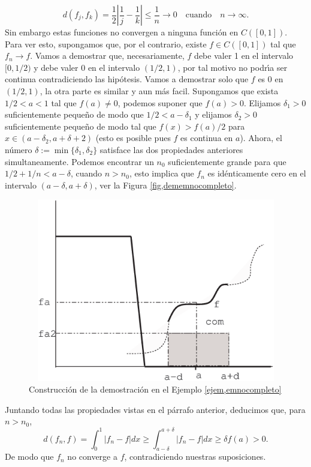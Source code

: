 \begin{ejemplo}
\[
    d(f_j,f_k)=\frac12|\frac1j-\frac1k|\leq \frac1n\rightarrow
    0\quad\text{cuando}\quad n\rightarrow \infty.
\]
Sin embargo estas funciones no convergen a ninguna funci\'on en
$C([0,1])$. Para ver esto, supongamos que, por el contrario,
existe $f\in C([0,1])$ tal que $f_n\rightarrow f$. Vamos a
demostrar que, necesariamente, $f$ debe valer 1 en el intervalo
$[0,1/2)$ y debe valer 0 en el intervalo $(1/2,1)$, por tal motivo
no podr\'{\i}a ser continua contradiciendo las hip\'otesis. Vamos
a demostrar solo que $f$ es 0 en $(1/2,1)$, la otra parte es
similar y aun m\'as facil. Supongamos que exista $1/2<a<1$ tal que
$f(a)\neq 0$, podemos suponer que $f(a)>0$. Elijamos $\delta_1>0$
suficientemente peque\~no de modo que $1/2<a-\delta_1$ y elijamos
$\delta_2>0$ suficientemente peque\~no de modo tal que
$f(x)>f(a)/2$ para $x\in(a-\delta_2,a+\delta+2)$ (esto es posible
pues $f$ es continua en $a$). Ahora, el n\'umero
$\delta:=\min\{\delta_1,\delta_2\}$ satisface las dos propiedades
anteriores simultaneamente. Podemos encontrar un $n_0$
suficientemente grande para que $1/2+1/n<a-\delta$, cuando
$n>n_0$, esto implica que $f_n$ es id\'enticamente cero en el
intervalo $(a-\delta,a+\delta)$, ver la Figura
\vref{fig,dememnocompleto}.
\begin{figure}[h]
\begin{center}
    \includegraphics[height=8cm,width=12cm]{demnoco.eps}
    \caption{Construcci\'on de la demostraci\'on en el Ejemplo
    \ref{ejem,emnocompleto}}\label{fig,dememnocompleto}
\end{center}
\end{figure}
Juntando todas las propiedades vistas en el p\'arrafo anterior,
deducimos que, para $n>n_0$,
\[
    d(f_n,f)=\int_0^1|f_n-f|dx\geq\int_{a-\delta}^{a+\delta}|f_n-f|dx\geq
    \delta f(a)>0.
\]
De modo que $f_n$ no converge a $f$, contradiciendo nuestras
suposiciones.
\end{ejemplo}


